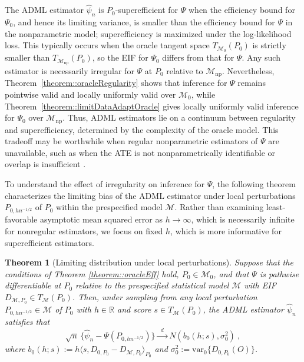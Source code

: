 \documentclass[11pt]{article}
\newtheorem{theorem}{Theorem}
\theoremstyle{definition}
\begin{document}
The ADML estimator \(\widehat{\psi}_n\) is \(P_0\)-superefficient for \(\Psi\) when the efficiency bound for \(\Psi_0\), and hence its limiting variance, is smaller than the efficiency bound for \(\Psi\) in the nonparametric model; superefficiency is maximized under the log-likelihood loss. This typically occurs when the oracle tangent space \(T_{\mathcal{M}_0}(P_0)\) is strictly smaller than \(T_{\mathcal{M}_{\mathrm{np}}}(P_0)\), so the EIF for \(\Psi_0\) differs from that for \(\Psi\). Any such estimator is necessarily irregular for \(\Psi\) at \(P_0\) relative to \(\mathcal{M}_{\mathrm{np}}\). Nevertheless, Theorem~\ref{theorem::oracleRegularity} shows that inference for \(\Psi\) remains pointwise valid and locally uniformly valid over \(\mathcal{M}_0\), while Theorem~\ref{theorem::limitDataAdaptOracle} gives locally uniformly valid inference for \(\Psi_0\) over \(\mathcal{M}_{\mathrm{np}}\). Thus, ADML estimators lie on a continuum between regularity and superefficiency, determined by the complexity of the oracle model. This tradeoff may be worthwhile when regular nonparametric estimators of \(\Psi\) are unavailable, such as when the ATE is not nonparametrically identifiable or overlap is insufficient \citep{CTMLE, ATEsupereff, moosavi2023costs, dukes2024doubly}.
 
 
 
 
To understand the effect of irregularity on inference for \(\Psi\), the following theorem characterizes the limiting bias of the ADML estimator under local perturbations \(P_{0,hn^{-1/2}}\) of \(P_0\) within the prespecified model \(\mathcal{M}\). Rather than examining least-favorable asymptotic mean squared error as \(h \to \infty\), which is necessarily infinite for nonregular estimators, we focus on fixed \(h\), which is more informative for superefficient estimators.


 


\begin{theorem}[Limiting distribution under local perturbations]
    Suppose that the conditions of Theorem \ref{theorem::oracleEff} hold, $P_0 \in \mathcal{M}_0$, and that $\Psi$ is pathwise differentiable at $P_0$ relative to the prespecified statistical model $\mathcal{M}$ with EIF $D_{\mathcal{M}, P_0} \in T_{\mathcal M} (P_0)$. Then, under sampling from any local perturbation $P_{0,hn^{-1/2}} \in  \mathcal{M}$ of $P_0$ with $h \in \mathbb{R}$ and score $s \in T_{\mathcal M} (P_0)$, the ADML estimator $\widehat{\psi}_n$ satisfies that
    $$\sqrt{n}\,\{\widehat{\psi}_n - \Psi(P_{0,hn^{-1/2}})\}\xrightarrow[ ]{\;\;d\;\;}  N(b_0(h;s), \sigma_0^2)\ ,$$ 
    where $b_{0}(h;s) := h\langle s, D_{0,P_0} -  D_{\mathcal{M}, P_0}\rangle_{P_0} $ and $\sigma_0^2 := \mathrm{var}_0\{D_{0,P_0}(O)\}$.  
    \label{theorem::irreg}
    
\end{theorem}
\end{document}

